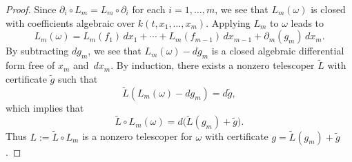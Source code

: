 \documentclass{amsart}
\theoremstyle{definition}
\numberwithin{equation}{section}
\numberwithin{thm}{section}
\begin{document}
\begin{proof}
Since $\partial_i\circ L_m = L_m \circ \partial_i$ for each $i = 1,\ldots,m$, we see that $L_m(\omega)$ is closed with coefficients algebraic over $k(t,x_1,\ldots,x_m)$. Applying $L_m$ to $\omega$ leads to
\[
L_m (\omega)= L_m(f_1) \, dx_1 +\cdots +  L_m(f_{m-1})\, dx_{m-1} + \partial_m (g_m) \, dx_m.
\]
By subtracting $dg_m$, we see that $L_m(\omega) - dg_m$ is a closed algebraic differential form free of $x_m$ and~$dx_m$. By induction, there exists a nonzero telescoper $\tilde{L}$ with certificate $\tilde{g}$ such that
\[
\tilde{L} (L_m(\omega) - dg_m) = d \tilde{g},
\]
which implies that
\[
\tilde{L}\circ L_m (\omega)= d\big(\tilde{L}(g_m)+\tilde{g}\big).
\]
Thus $L := \tilde{L}\circ L_m$ is a nonzero telescoper for $\omega$ with certificate $g = \tilde{L}(g_m)+\tilde{g}$.
\end{proof}

\end{document}
